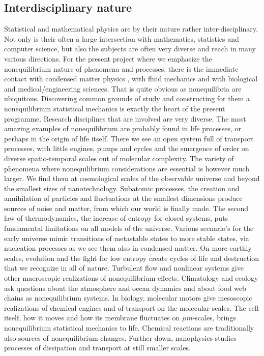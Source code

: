 \subsection{Interdisciplinary nature}\label{sec:interdisc}

Statistical and mathematical physics are by their nature rather inter-disciplinary.  Not only is their often a large intersection with mathematics, statistics and computer science, but also the subjects are often very diverse and reach in many various directions.  For the present project where we emphasize the nonequilibrium nature of phenomena and processes, there is the immediate contact with condensed matter physics , with fluid mechanics and with biological and medical/engineering sciences.  That is quite obvious as nonequilibria are ubiquitous.  Discovering common grounds of study and constructing for them a nonequilibrium statistical mechanics is exactly the heart of the present programme.
Research disciplines that are involved are very diverse. The most amazing examples of nonequilibrium are probably found in life processes, or perhaps in the origin of life itself.  There we see an open system full of transport processes, with little engines, pumps and cycles and the emergence of order on diverse spatio-temporal scales out of molecular complexity. The variety of phenomena where nonequilibrium considerations are essential is however much larger.  We find them at cosmological scales of the observable universe  and beyond the smallest sizes of nanotechnology.  Subatomic processes, the creation and annihilation of particles and fluctuations at the smallest dimensions produce sources of noise and matter, from which our world is finally made.  The second law of thermodynamics, the increase of entropy for closed systems, puts fundamental limitations on all models of the universe.  Various scenario's for the early universe  mimic transitions of metastable states to more   stable states, via
 nucleation processes as we see them also  in condensed matter.  On more earthly scales, evolution and the fight for low entropy create cycles of life and destruction that we recognize in all of nature.    Turbulent
  flow and nonlinear systems give other macroscopic realizations of nonequilibrium effects.   Climatology and ecology ask questions about the atmosphere and ocean dynamics and about food web chains as  nonequilibrium systems.
  In biology, molecular motors   give mesoscopic realizations of chemical engines and of transport on the molecular scales.   The cell itself, how it moves and how its membrane fluctuates on $\mu m$-scales, brings nonequilibrium statistical mechanics to life.   Chemical reactions are traditionally also sources of nonequilibrium changes.
 Further down, nanophysics studies processes of dissipation and transport at still smaller scales.




